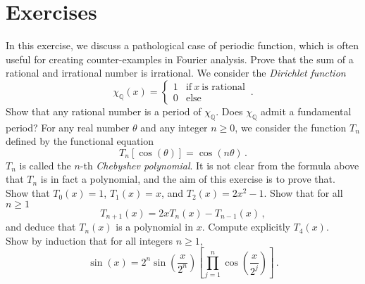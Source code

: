 \section{Exercises}
\begin{ExerciseList}
  \Exercise[label=dirichletfn]
  In this exercise, we discuss a pathological case of periodic function, which is often
  useful for creating counter-examples in Fourier analysis.
  \Question Prove that the sum of a rational and irrational number is irrational.
  \Question We consider the \emph{Dirichlet function}
  \begin{equation}
    \chi_{\mathbb{Q}}(x)=
    \begin{cases}
      1 & \text{if}~x~\text{is rational}\\
      0 & \text{else}
    \end{cases}\,.
  \end{equation}
  Show that any rational number is a period of $\chi_{\mathbb{Q}}$.
  \Question Does $\chi_{\mathbb{Q}}$ admit a fundamental period?
  \Exercise[label=chebyshev]
  For any real number $\theta$ and any integer $n\geq 0$, we consider the function $T_n$ defined by
  the functional equation
  \begin{equation}
    T_n[\cos(\theta)]=\cos(n\theta)\,.
  \end{equation}
  $T_n$ is called the $n$-th \emph{Chebyshev polynomial}. It is not clear from the formula
  above that $T_n$ is in fact a polynomial, and the aim of this exercise is to prove that.
  \Question Show that $T_0(x)=1$, $T_1(x)=x$, and $T_2(x)=2x^2-1$.
  \Question Show that for all $n\geq 1$
  \begin{equation}
    T_{n+1}(x)=2x T_n(x)-T_{n-1}(x)\,,
  \end{equation}
  and deduce that $T_n(x)$ is a polynomial in $x$.
  \Question Compute explicitly $T_4(x)$.
  \Exercise[label=viete]~
  \Question Show by induction that for all integers $n\geq 1$,
  \begin{equation}
    \sin(x)=2^n\sin\left(\frac{x}{2^n}\right)\left[\prod_{j=1}^n\cos\left(\frac{x}{2^j}\right)\right]\,.
  \end{equation}

\end{ExerciseList}
